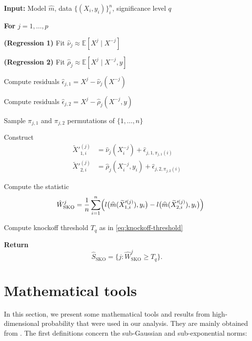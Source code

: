 \documentclass{article}
\theoremstyle{plain}
\theoremstyle{definition}
\theoremstyle{remark}
\begin{document}
\begin{algorithm}[H]
\caption{Semi-knockoffs (SKO)}
\label{alg:semi_knockoffs}
\begin{algorithmic}[1]
\item[] \textbf{Input:} Model $\widehat{m}$, data $\{(X_i,y_i)\}_i^n$, significance level $q$
\item[] \textbf{For} $j = 1,\dots,p$
    \item[] \quad \textbf{(Regression 1)} Fit $\widehat{\nu}_j \approx \mathbb{E}[X^j \mid X^{-j}]$
    \item[] \quad \textbf{(Regression 2)} Fit $\widehat{\rho}_j \approx \mathbb{E}[X^j \mid X^{-j}, y]$
    \item[] \quad Compute residuals $\widehat{\epsilon}_{j,1} = X^j - \widehat{\nu}_j(X^{-j})$
    \item[] \quad Compute residuals $\widehat{\epsilon}_{j,2} = X^j - \widehat{\rho}_j(X^{-j}, y)$
    \item[] \quad Sample $\pi_{j,1}$ and $\pi_{j,2}$ permutations of $\{1,\dots,n\}$
    \item[] \quad Construct 
    \begin{align*}
        \widetilde{X}'^{(j)}_{1,i}
        &= \widehat{\nu}_j(X^{-j}_i)
        + \widehat{\epsilon}_{j,1,\pi_{j,1}(i)}\\
        \widetilde{X}'^{(j)}_{2,i}
        &= \widehat{\rho}_j(X^{-j}_i, y_i)
        + \widehat{\epsilon}_{j,2,\pi_{j,2}(i)}
    \end{align*}
    \item[] \quad Compute the statistic %
    \[
    \quad\hat{W}^j_\mathrm{SKO} = \frac{1}{n} \sum_{i=1}^{n}
    \Bigl( 
        l\bigl(\widehat{m}(\widetilde{X}'^{(j)}_{1,i}), y_i\bigr)
        - 
        l\bigl(\widehat{m}(\widetilde{X}'^{(j)}_{2,i}), y_i\bigr)
    \Bigr)
    \]
\item[] Compute knockoff threshold $T_q$ as in \eqref{eq:knockoff-threshold}
\item[] \textbf{Return} 
\[
\widehat{S}_{\mathrm{SKO}}
=
\bigl\{
j : \hat{W}^j_\mathrm{SKO} \ge T_q
\bigr\}.
\]
\end{algorithmic}
\label{alg:semi-KO}
\end{algorithm}
\section{Mathematical tools}
 
 
In this section, we present some mathematical tools and results from high-dimensional probability that were used in our analysis. They are mainly obtained from \citet{Vershynin_2018}. The first definitions concern the sub-Gaussian and sub-exponential norms:
\end{document}
